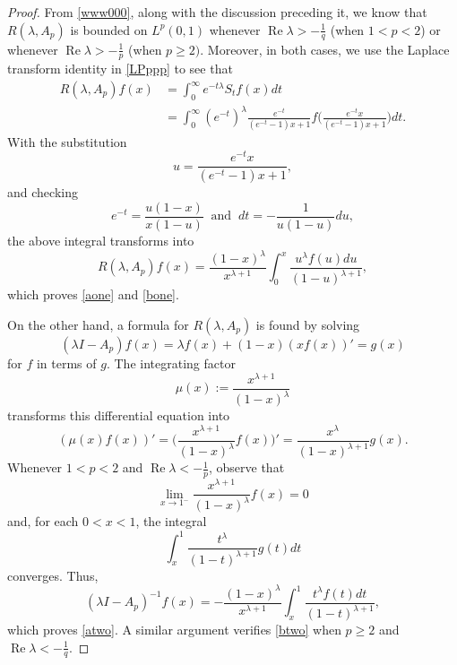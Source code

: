 \documentclass[11pt]{amsart}
\numberwithin{equation}{section}
\theoremstyle{plain}
\theoremstyle{definition}
\renewcommand{\geq}{\geqslant}
\renewcommand{\Re}[1]{\operatorname{Re} #1 }
\newcommand{\0}{{\color{lightgray}0}}
\begin{document}
\begin{proof}
From \eqref{www000}, along with the discussion preceding it, we know  that $R(\lambda, A_p)$ is bounded on $L^p(0, 1)$ whenever $\Re \lambda>-\frac{1}{q}$ (when $1 < p < 2$) or whenever $\Re \lambda > -\frac{1}{p}$ (when $p \geq 2)$.
Moreover, in both cases, we use the Laplace transform identity in  \eqref{LPppp} to see that 
\begin{align*}
R(\lambda,A_p)f(x) & =\int_{0}^{\infty}e^{-t\lambda}S_{t}f(x)dt\\
& =\int_{0}^{\infty}(e^{-t})^{\lambda}\frac{e^{-t}}{(e^{-t}-1)x+1}f\bigg(\frac{e^{-t}x}{(e^{-t}-1)x+1}\bigg)dt.
\end{align*}
With the substitution 
$$u=\frac{e^{-t}x}{(e^{-t}-1)x+1},$$ 
and checking
$$e^{-t} = \frac{u (1 - x)}{x (1 - u)} \;  \; \mbox{and} \; \; dt = - \frac{1}{u (1 - u)} du,$$
the above integral transforms into
$$
R(\lambda,A_p)f(x) = 
 \frac{(1-x)^{\lambda}}{x^{\lambda+1}}\int_{0}^{x}\frac{u^{\lambda}f(u)du}{(1-u)^{\lambda+1}},
$$
which proves \eqref{aone} and \eqref{bone}.



On the other hand, a formula for $R(\lambda,A_p)$ is found by solving
$$(\lambda I-A_p)f(x)=\lambda f(x)+(1-x)(xf(x))'=g(x)$$
for $f$ in terms of $g$. The integrating factor
$$\mu(x):=\frac{x^{\lambda +1}}{(1-x)^{\lambda}}$$
transforms this differential equation into 
$$(\mu(x)f(x))'=\Big(\frac{x^{\lambda +1}}{(1-x)^{\lambda}}f(x)\Big)'=\frac{x^{\lambda}}{(1-x)^{\lambda +1}}g(x).$$
Whenever $1 < p < 2$ and $\Re \lambda <-\frac{1}{p}$, observe that
$$\lim_{x \to 1^{-}} \frac{x^{\lambda +1}}{(1-x)^{\lambda}}f(x) = 0$$ and, for each $0 < x < 1$, the integral 
$$\int_{x}^{1}\frac{t^{\lambda}}{(1-t)^{\lambda +1}}g(t)dt$$
converges.
Thus,
$$(\lambda I-A_p)^{-1}f(x)=-\frac{(1-x)^{\lambda}}{x^{\lambda+1}}\int_{x}^{1}\frac{t^{\lambda}f(t)dt}{(1-t)^{\lambda+1}},
$$
which proves \eqref{atwo}. A similar argument verifies \eqref{btwo} when $p \geq 2$ and $\Re \lambda < -\frac{1}{q}$. 



\end{proof}
\end{document}
